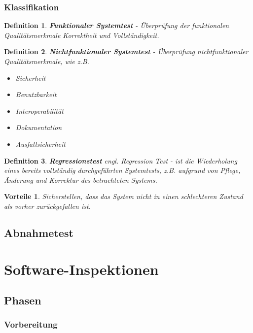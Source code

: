 \documentclass[a4paper]{article}
\theoremstyle{break}
\newtheorem{defi}{Definition}[section]
\newtheorem{why}{Vorteile}[section]
\begin{document}
          \subsubsection{Klassifikation}
          \begin{defi}
            \textbf{Funktionaler Systemtest} - Überprüfung der funktionalen Qualitätsmerkmale Korrektheit und Vollständigkeit.
          \end{defi}
          \begin{defi}
            \textbf{Nichtfunktionaler Systemtest} - Überprüfung nichtfunktionaler Qualitätsmerkmale, wie z.B.
            \begin{itemize}
            \item Sicherheit
            \item Benutzbarkeit
            \item Interoperabilität
            \item Dokumentation
            \item Ausfallsicherheit
            \end{itemize}
          \end{defi}


          \begin{defi}
            \textbf{Regressionstest} \textit{engl. Regression Test} - ist die Wiederholung eines bereits vollständig durchgeführten Systemtests, z.B. aufgrund von Pflege, Änderung und Korrektur des betrachteten Systems.
          \end{defi}

          \begin{why}
            Sicherstellen, dass das System nicht in einen schlechteren Zustand als vorher zurückgefallen ist.
            \end{why}
          
          \subsection{Abnahmetest}
          \section{Software-Inspektionen}
          \subsection{Phasen}
          \subsubsection{Vorbereitung}
\end{document}
